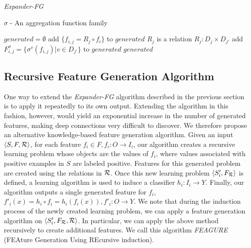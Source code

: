\documentclass[twoside,11pt]{article}
\theoremstyle{definition}
\begin{document}
\begin{algorithm}[H]
	\caption{\emph{Expander-FG}}
	\label{code-compete}
	\small
	$\sigma$ - An aggregation function family
	\begin{algorithmic}
		\State $generated=\emptyset$
		\State add $\{f_{i,j}=R_j\circ f_i\}$ to $generated$
		\Else \Comment $R_j$ is a relation $R_j:D_j\times D_{j'}$
		\State add $F^\sigma_{i,j}=\{\sigma^v(f_{i,j})|v\in D_{j'}\}$ to $generated$
		\EndIf
		\EndFor
		\EndFor
		\State \Return $generated$ 
		\EndFunction
		
	\end{algorithmic}
\end{algorithm}

\subsection{Recursive Feature Generation Algorithm}
\label{algorithm_section}
One way to extend the \emph{Expander-FG} algorithm described in the previous section is to apply it repeatedly to its own output.
Extending the algorithm in this fashion, however, would yield an exponential increase in the number of generated features, making deep connections very difficult to discover.
We therefore propose an alternative knowledge-based feature generation algorithm. Given an input $\langle S,F,{\cal R} \rangle$, for each feature $f_i\in F, f_i:O\rightarrow I_i$, our algorithm creates a recursive learning problem whose objects are the values of $f_i$, where values associated with positive examples in $S$ are labeled positive. %
Features for this generated problem are created using the relations in ${\cal R}$. Once this new learning problem $\langle S'_i,F_{\cal R}\rangle$ is defined, a learning algorithm is used to induce a classifier $h_i:I_i\rightarrow Y$. Finally, our algorithm outputs a single generated feature for $f_i$, $f'_i(x)=h_i\circ f_i=h_i(f_i(x)), f'_i:O\rightarrow Y$.
We note that during the induction process of the newly created learning problem, we can apply a feature generation algorithm on $\langle S'_i,F_{\cal R},{\cal R} \rangle$. In particular, we can apply the above method recursively to create additional features. We call this algorithm \emph{FEAGURE} (FEAture Generation Using REcursive induction).
\end{document}
